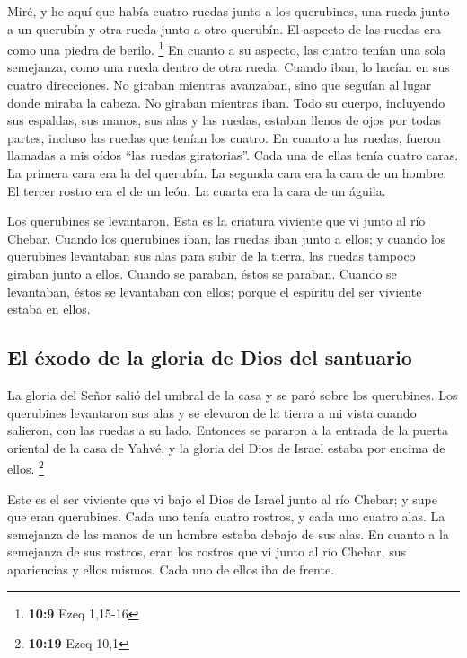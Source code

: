 \begin{paracol}{2}
 Miré, y he aquí que había cuatro ruedas junto a los
querubines, una rueda junto a un querubín y otra rueda junto a otro
querubín. El aspecto de las ruedas era como una piedra de berilo.
\footnote{\textbf{10:9} Ezeq 1,15-16}  En cuanto a su
aspecto, las cuatro tenían una sola semejanza, como una rueda dentro de
otra rueda.  Cuando iban, lo hacían en sus cuatro
direcciones. No giraban mientras avanzaban, sino que seguían al lugar
donde miraba la cabeza. No giraban mientras iban.  Todo
su cuerpo, incluyendo sus espaldas, sus manos, sus alas y las ruedas,
estaban llenos de ojos por todas partes, incluso las ruedas que tenían
los cuatro.  En cuanto a las ruedas, fueron llamadas a
mis oídos ``las ruedas giratorias''.  Cada una de ellas
tenía cuatro caras. La primera cara era la del querubín. La segunda cara
era la cara de un hombre. El tercer rostro era el de un león. La cuarta
era la cara de un águila.

 Los querubines se levantaron. Esta es la criatura
viviente que vi junto al río Chebar.  Cuando los
querubines iban, las ruedas iban junto a ellos; y cuando los querubines
levantaban sus alas para subir de la tierra, las ruedas tampoco giraban
junto a ellos.  Cuando se paraban, éstos se paraban.
Cuando se levantaban, éstos se levantaban con ellos; porque el espíritu
del ser viviente estaba en ellos.

\hypertarget{el-uxe9xodo-de-la-gloria-de-dios-del-santuario}{%
\subsection{El éxodo de la gloria de Dios del
santuario}\label{el-uxe9xodo-de-la-gloria-de-dios-del-santuario}}

 La gloria del Señor salió del umbral de la casa y se
paró sobre los querubines.  Los querubines levantaron sus
alas y se elevaron de la tierra a mi vista cuando salieron, con las
ruedas a su lado. Entonces se pararon a la entrada de la puerta oriental
de la casa de Yahvé, y la gloria del Dios de Israel estaba por encima de
ellos. \footnote{\textbf{10:19} Ezeq 10,1}

 Este es el ser viviente que vi bajo el Dios de Israel
junto al río Chebar; y supe que eran querubines.  Cada
uno tenía cuatro rostros, y cada uno cuatro alas. La semejanza de las
manos de un hombre estaba debajo de sus alas.  En cuanto
a la semejanza de sus rostros, eran los rostros que vi junto al río
Chebar, sus apariencias y ellos mismos. Cada uno de ellos iba de frente.


\end{paracol}
